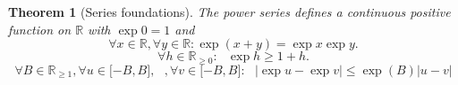 \documentclass[11pt,reqno]{amsart}
\theoremstyle{redplain}
\newtheorem{theorem}{Theorem}[section]
\numberwithin{equation}{section}
\begin{document}
\begin{theorem}[Series foundations]
\label{lem:series-foundations} The power series defines a continuous
positive function on $\mathbb{R}$ with $\exp 0=1$ and 
\begin{equation*}
\forall x\in 
\mathbb{R}
,\forall y\in 
\mathbb{R}
:\exp (x+y)=\exp x\exp y.
\end{equation*}
\begin{equation*}
\forall h\in 
\mathbb{R}
_{\geq 0}:\text{ }\exp h\geq 1+h.
\end{equation*}%
\begin{equation}
\forall B\in 
\mathbb{R}
_{\geq 1},\forall u\in \lbrack -B,B],\text{ },\forall v\in \lbrack -B,B]:%
\text{ }|\exp u-\exp v|\leq \exp (B)|u-v|  \label{eq:exp-lipschitz}
\end{equation}
\end{theorem}
\end{document}
